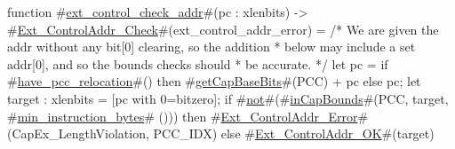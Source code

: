 function #\hyperref[sailRISCVzextzycontrolzycheckzyaddr]{ext\_control\_check\_addr}#(pc : xlenbits) -> #\hyperref[sailRISCVzExtzyControlAddrzyCheck]{Ext\_ControlAddr\_Check}#(ext_control_addr_error) = {
  /* We are given the addr without any bit[0] clearing, so the addition
   * below may include a set addr[0], and so the bounds checks should
   * be accurate.
   */
  let pc = if #\hyperref[sailRISCVzhavezypcczyrelocation]{have\_pcc\_relocation}#() then #\hyperref[sailRISCVzgetCapBaseBits]{getCapBaseBits}#(PCC) + pc else pc;
  let target : xlenbits = [pc with 0=bitzero];
  if   #\hyperref[sailRISCVznot]{not}#(#\hyperref[sailRISCVzinCapBounds]{inCapBounds}#(PCC, target, #\hyperref[sailRISCVzminzyinstructionzybytes]{min\_instruction\_bytes}# ()))
  then #\hyperref[sailRISCVzExtzyControlAddrzyError]{Ext\_ControlAddr\_Error}#(CapEx_LengthViolation, PCC_IDX)
  else #\hyperref[sailRISCVzExtzyControlAddrzyOK]{Ext\_ControlAddr\_OK}#(target)
}

